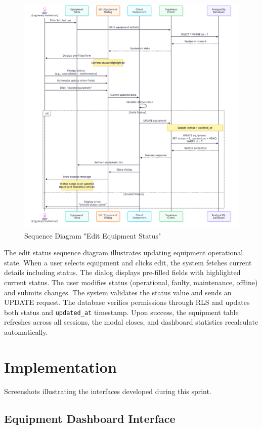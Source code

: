 \begin{figure}[H]
    \centering
    \includegraphics[width=0.85\linewidth]{img/chap_04/edit_equipment_status_sequence.png}
    \caption{Sequence Diagram "Edit Equipment Status"}
    \label{fig:sequence_edit_status}
\end{figure}

The edit status sequence diagram illustrates updating equipment operational state. When a user selects equipment and clicks edit, the system fetches current details including status. The dialog displays pre-filled fields with highlighted current status. The user modifies status (operational, faulty, maintenance, offline) and submits changes. The system validates the status value and sends an UPDATE request. The database verifies permissions through RLS and updates both status and \texttt{updated\_at} timestamp. Upon success, the equipment table refreshes across all sessions, the modal closes, and dashboard statistics recalculate automatically.

\section{Implementation}

Screenshots illustrating the interfaces developed during this sprint.

\subsection{Equipment Dashboard Interface}

